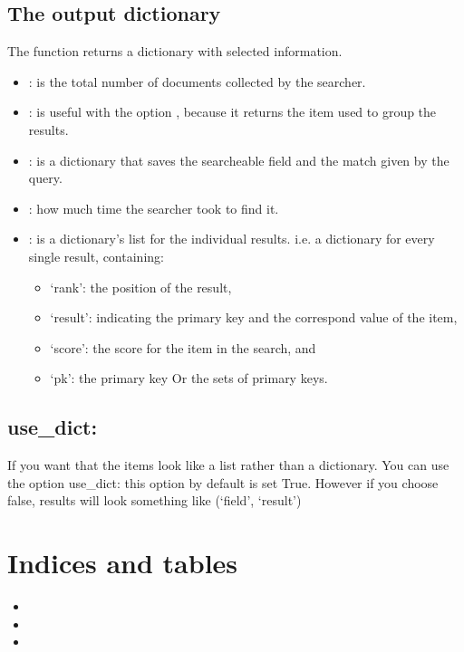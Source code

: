 \documentclass[letterpaper,10pt,english]{sphinxmanual}
\begin{document}
\section{The output dictionary}
\label{Introduction:the-output-dictionary}
The  function returns a dictionary with selected information.
\begin{itemize}
\item {} 
: is the total number of documents collected by the searcher.

\item {} 
: is useful with the option , because it returns the item used to group the results.

\item {} 
: is a dictionary that saves the searcheable field and the match given by the query.

\item {} 
: how much time the searcher took to find it.

\item {} 
: is  a dictionary's list for the individual results. i.e. a dictionary for every single result, containing:
\begin{itemize}
\item {} 
`rank': the position of the result,

\item {} 
`result': indicating the primary key and the correspond value of the item,

\item {} 
`score': the score for the item in the search, and

\item {} 
`pk': the primary key Or the sets of primary keys.

\end{itemize}

\end{itemize}


\section{use\_dict:}
\label{Introduction:use-dict}
\href{https://pypi.python.org/pypi/Flask-PonyWhoosh}{}

If you want that the  items look like a list rather than a dictionary. You can use the option use\_dict: this option by default is set True. However if you choose false, results will look something like (`field', `result')


\chapter{Indices and tables}
\label{index:indices-and-tables}\begin{itemize}
\item {} 

\item {} 

\item {} 

\end{itemize}



\renewcommand{\indexname}{Index}
\printindex
\end{document}
